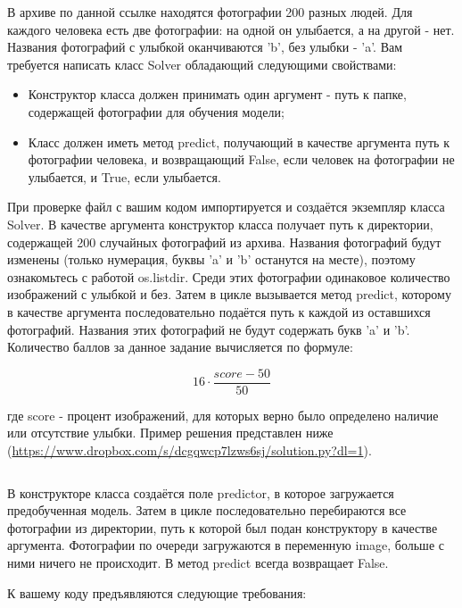 
В архиве по данной ссылке находятся фотографии 200 разных людей. 
Для каждого человека есть две фотографии: на одной он улыбается, а на другой - нет. Названия фотографий 
с улыбкой оканчиваются 'b', без улыбки - 'a'. Вам требуется написать класс Solver обладающий следующими свойствами:

\begin{itemize}
    \item Конструктор класса должен принимать один аргумент - путь к папке, содержащей фотографии для обучения модели;
    \item Класс должен иметь метод predict, получающий в качестве аргумента путь к фотографии человека, и возвращающий False, если человек на фотографии не улыбается, и True, если улыбается.
\end{itemize}

При проверке файл с вашим кодом импортируется и создаётся экземпляр класса Solver. В качестве аргумента 
конструктор класса получает путь к директории, содержащей 200 случайных фотографий из архива. Названия 
фотографий будут изменены (только нумерация, буквы 'a' и 'b' останутся на месте), поэтому ознакомьтесь с 
работой os.listdir. Среди этих фотографии одинаковое количество изображений с улыбкой и без. Затем в цикле 
вызывается метод predict, которому в качестве аргумента последовательно подаётся путь к каждой из оставшихся 
фотографий. Названия этих фотографий не будут содержать букв  'a' и 'b'. Количество баллов за данное 
задание вычисляется по формуле:

$$16 \cdot \frac{score - 50}{50}$$

где score - процент изображений, для которых верно было определено наличие или отсутствие улыбки.
Пример решения представлен ниже (\url{https://www.dropbox.com/s/dcgqwcp7lzws6sj/solution.py?dl=1}).

\inputminted[fontsize=\footnotesize, linenos]{python}{2nd_tour/neuro/task_09/part_01.py}

В конструкторе класса создаётся поле predictor, в которое загружается предобученная модель. Затем в цикле последовательно перебираются все фотографии из директории, путь к которой был подан конструктору в качестве аргумента. Фотографии по очереди загружаются в переменную image, больше с ними ничего не происходит.
В метод predict всегда возвращает False.

К вашему коду предъявляются следующие требования:

